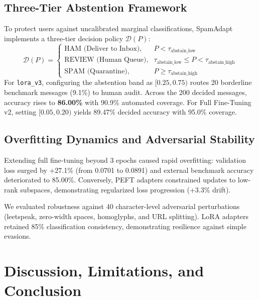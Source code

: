 \documentclass[conference]{IEEEtran}
\begin{document}
\subsection{Three-Tier Abstention Framework}
To protect users against uncalibrated marginal classifications, SpamAdapt implements a three-tier decision policy $\mathcal{D}(P)$:
\begin{equation}
    \mathcal{D}(P) = \begin{cases}
        \text{HAM (Deliver to Inbox)}, & P < \tau_{\text{abstain\_low}} \\
        \text{REVIEW (Human Queue)}, & \tau_{\text{abstain\_low}} \le P < \tau_{\text{abstain\_high}} \\
        \text{SPAM (Quarantine)}, & P \ge \tau_{\text{abstain\_high}}
    \end{cases}
    \label{eq:abstention}
\end{equation}
For \texttt{lora\_v3}, configuring the abstention band as $[0.25, 0.75)$ routes 20 borderline benchmark messages (9.1\%) to human audit. Across the 200 decided messages, accuracy rises to \textbf{86.00\%} with 90.9\% automated coverage. For Full Fine-Tuning v2, setting $[0.05, 0.20)$ yields 89.47\% decided accuracy with 95.0\% coverage.

\subsection{Overfitting Dynamics and Adversarial Stability}
Extending full fine-tuning beyond 3 epochs caused rapid overfitting: validation loss surged by +27.1\% (from 0.0701 to 0.0891) and external benchmark accuracy deteriorated to 85.00\%. Conversely, PEFT adapters constrained updates to low-rank subspaces, demonstrating regularized loss progression (+3.3\% drift).

We evaluated robustness against 40 character-level adversarial perturbations (leetspeak, zero-width spaces, homoglyphs, and URL splitting). LoRA adapters retained 85\% classification consistency, demonstrating resilience against simple evasions.

\newpage
\section{Discussion, Limitations, and Conclusion}
\label{sec:discussion}
\end{document}

